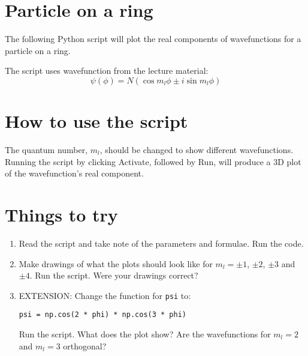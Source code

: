 \documentclass{article}
\begin{document}
\section{Particle on a ring}

The following Python script will plot the real components of wavefunctions for a particle on a ring. \par\medskip 
\noindent The script uses wavefunction from the lecture material:
\[\psi (\phi) = N(\cos m_l \phi \pm i \sin m_l \phi) \]

\section{How to use the script}
The quantum number, $m_l$, should be changed to show different wavefunctions. Running the script by clicking Activate, followed by Run, will produce a 3D plot of the wavefunction's real component.

\section{Things to try}
\begin{enumerate}
\item Read the script and take note of the parameters and formulae. Run the code.
\item Make drawings of what the plots should look like for $m_l=\pm 1$, $\pm 2$, $\pm 3$ and $\pm 4$. Run the script. Were your drawings correct? 
\item EXTENSION: Change the function for \texttt{psi} to: \par\texttt{psi = np.cos(2 * phi) * np.cos(3 * phi)}\par Run the script. What does the plot show? Are the wavefunctions for $m_l = 2$ and $m_l = 3$ orthogonal?
\end{enumerate}
\end{document}
